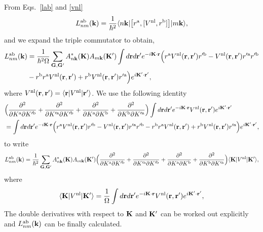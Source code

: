 \documentclass[floatfix,prb,aps,superscriptaddress,11pt,preprint,letterpaper]{revtex4}
\def\chon{black}
\begin{document}
From Eqs.~\eqref{lab} and \eqref{vnl} 
\begin{align}\label{3.1}
L^{\mathrm{a}\mathrm{b}}_{nm}(\mathbf{k}) 
=
\frac{1}{\hbar^2}
\langle n\mathbf{k} |
\big[ r^{\mathrm{a}},[ V^{\mathrm{nl}}, r^{\mathrm{b}}]\big]
| m\mathbf{k} \rangle
,
\end{align} 
{\color{\chon} and we expand the triple commutator to obtain,}
\begin{align}\label{3.5}
L^{\mathrm{a}\mathrm{b}}_{nm}(\mathbf{k}) 
&=
\frac{1}{\hbar^2\Omega}
\sum_{\mathbf{G},\mathbf{G}'} 
A^*_{n\mathbf{k}}(\mathbf{K}) 
A_{m\mathbf{k}}(\mathbf{K}')
\int
d\mathbf{r} d\mathbf{r}'
 e^{-i\mathbf{K}\cdot\mathbf{r}}
\Big(
r^{\mathrm{a}}
V^{\mathrm{nl}}(\mathbf{r},\mathbf{r}')
r'^{\mathrm{b}}
-
V^{\mathrm{nl}}(\mathbf{r},\mathbf{r}')
r'^{\mathrm{a}}
r'^{\mathrm{b}}
\nonumber\\
&-
r^{\mathrm{b}}
r^{\mathrm{a}}
V^{\mathrm{nl}}(\mathbf{r},\mathbf{r}')
+
 r^{\mathrm{b}}
V^{\mathrm{nl}}(\mathbf{r},\mathbf{r}')
r'^{\mathrm{a}}
\Big) 
 e^{i\mathbf{K}'\cdot\mathbf{r}'}
,
\end{align} 
where 
$V^{\mathrm{nl}}(\mathbf{r},\mathbf{r}') = \langle \mathbf{r} | V^{\mathrm{nl}}| \mathbf{r}' \rangle$.
We use the following identity
\begin{align}\label{3.4}
&
\Big(
\frac{\partial^2}{\partial K^{\mathrm{a}}\partial K'^{\mathrm{b}}}
+
\frac{\partial^2}{\partial K'^{\mathrm{a}}\partial K'^{\mathrm{b}}}
+
\frac{\partial^2}{\partial K^{\mathrm{a}}\partial K^{\mathrm{b}}}
+
\frac{\partial^2}{\partial K^{\mathrm{b}}\partial K'^{\mathrm{a}}}
\Big)
\int 
d\mathbf{r} d\mathbf{r}' 
 e^{-i\mathbf{K}\cdot\mathbf{r}}
V^{\mathrm{nl}}(\mathbf{r},\mathbf{r}') 
e^{i\mathbf{K}'\cdot\mathbf{r}'}
\nonumber\\
&=
\int d\mathbf{r} d\mathbf{r}'
 e^{-i\mathbf{K}\cdot\mathbf{r}}
\Big( 
r^{\mathrm{a}} 
V^{\mathrm{nl}}(\mathbf{r},\mathbf{r}') 
r'^{\mathrm{b}}
- 
V^{\mathrm{nl}}(\mathbf{r},\mathbf{r}') 
r'^{\mathrm{a}} 
r'^{\mathrm{b}}
- 
r^{\mathrm{b}} 
r^{\mathrm{a}} 
V^{\mathrm{nl}}(\mathbf{r},\mathbf{r}')
+
 r^{\mathrm{b}} 
V^{\mathrm{nl}}(\mathbf{r},\mathbf{r}') 
r'^{\mathrm{a}}
\Big)  
e^{i\mathbf{K}'\cdot\mathbf{r}'}
,
\end{align}
to write
\begin{align}\label{3.7}
L^{\mathrm{a}\mathrm{b}}_{nm}(\mathbf{k})
&=
\frac{1}{\hbar^2}
\sum_{\mathbf{G},\mathbf{G}'} 
A^*_{n\mathbf{k}}(\mathbf{K}) 
A_{m\mathbf{k}}(\mathbf{K}')
\Big(
\frac{\partial^2}{\partial K^{\mathrm{a}}\partial K'^{\mathrm{b}}}
+
\frac{\partial^2}{\partial K'^{\mathrm{a}}\partial K'^{\mathrm{b}}}
+
\frac{\partial^2}{\partial K^{\mathrm{a}}\partial K^{\mathrm{b}}}
+
\frac{\partial^2}{\partial K^{\mathrm{b}}\partial K'^{\mathrm{a}}}
\Big)
\langle \mathbf{K} | 
V^{\mathrm{nl}} 
| \mathbf{K}' \rangle, 
\nonumber\\
\end{align} 
where
\begin{align}\label{vkk}
\langle \mathbf{K} | 
V^{\mathrm{nl}} 
| \mathbf{K}' \rangle 
=
\frac{1}{\Omega}
\int 
d\mathbf{r} d\mathbf{r}' 
 e^{-i\mathbf{K}\cdot\mathbf{r}}
V^{\mathrm{nl}}(\mathbf{r},\mathbf{r}') 
e^{i\mathbf{K}'\cdot\mathbf{r}'}
,
\end{align}
The double derivatives with respect to $\mathbf{K}$ and $\mathbf{K}'$ 
can be worked out explicitly {\color{\chon} and} 
$L^{\mathrm{a}\mathrm{b}}_{nm}(\mathbf{k})$
{\color{\chon} can} be finally calculated.\cite{valerie}
\end{document}
